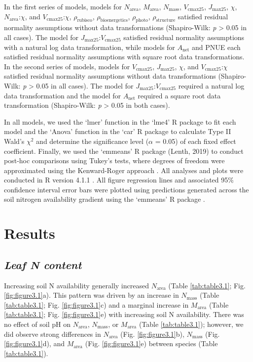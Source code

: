 In the first series of models, models for $N_\mathrm{area}$, $M_\mathrm{area}$, $N_\mathrm{mass}$, $V_\mathrm{cmax25}$, $J_\mathrm{max25}$, $\chi$, $N_{\mathrm{area}}$:$\chi$, and $V_{\mathrm{cmax25}}$:$\chi$, $\rho_\mathrm{rubisco}$, $\rho_\mathrm{bioenergetics}$, $\rho_\mathrm{photo}$, $\rho_\mathrm{structure}$ satisfied residual normality assumptions without data transformations (Shapiro-Wilk: \textit{p} > 0.05 in all cases). The model for $J_\mathrm{max25}$:$V_\mathrm{cmax25}$ satisfied residual normality assumptions with a natural log data transformation, while models for $A_\mathrm{net}$ and PNUE each satisfied residual normality assumptions with square root data transformations. In the second series of models, models for $V_\mathrm{cmax25}$, $J_\mathrm{max25}$, $\chi$, and $V_{\mathrm{cmax25}}$:$\chi$ satisfied residual normality assumptions without data transformations (Shapiro-Wilk: \textit{p} > 0.05 in all cases). The model for $J_\mathrm{max25}$:$V_\mathrm{cmax25}$ required a natural log data transformation and the model for $A_\mathrm{net}$ required a square root data transformation (Shapiro-Wilk: \textit{p} > 0.05 in both cases).
    
In all models, we used the ‘lmer’ function in the ‘lme4’ R package  to fit each model and the ‘Anova’ function in the ‘car’ R package  to calculate Type II Wald’s $\chi\mathrm{^{2}}$ and determine the significance level ($\alpha$ = 0.05) of each fixed effect coefficient. Finally, we used the ‘emmeans’ R package (Lenth, 2019) to conduct post-hoc comparisons using Tukey’s tests, where degrees of freedom were approximated using the Kenward-Roger approach . All analyses and plots were conducted in R version 4.1.1 . All figure regression lines and associated 95\% confidence interval error bars were plotted using predictions generated across the soil nitrogen availability gradient using the ‘emmeans’ R package .
    
\section{Results}
\subsection{\textit{Leaf N content}}
    
Increasing soil N availability generally increased $N_\mathrm{area}$ (Table \ref{tab:table3.1}; Fig. \ref{fig:figure3.1}a). This pattern was driven by an increase in $N_\mathrm{mass}$ (Table \ref{tab:table3.1}; Fig. \ref{fig:figure3.1}c) and a marginal increase in $M_\mathrm{area}$ (Table \ref{tab:table3.1}; Fig. \ref{fig:figure3.1}e) with increasing soil N availability. There was no effect of soil pH on $N_\mathrm{area}$, $N_\mathrm{mass}$, or $M_\mathrm{area}$ (Table \ref{tab:table3.1}); however, we did observe strong differences in $N_\mathrm{area}$ (Fig. \ref{fig:figure3.1}b), $N_\mathrm{mass}$ (Fig. \ref{fig:figure3.1}d), and $M_\mathrm{area}$ (Fig. \ref{fig:figure3.1}e) between species (Table \ref{tab:table3.1}).
    \clearpage

